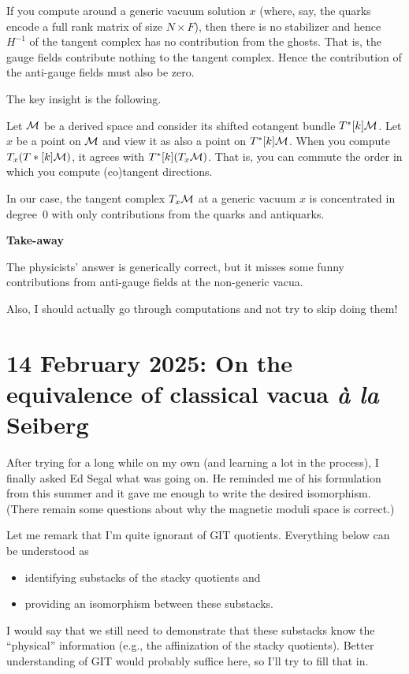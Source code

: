 \documentclass[11pt]{amsart}
\begin{document}
If you compute around a generic vacuum solution $x$ (where, say, the quarks encode a full rank matrix  of size $N \times F$), then there is no stabilizer and hence $H^{-1}$ of the tangent complex has no contribution from the ghosts. That is, the gauge fields contribute nothing to the tangent complex. Hence the contribution of the anti-gauge fields must also be zero.

The key insight is the following. 

Let $\mathcal M$ be a derived space and consider its shifted cotangent bundle $T^*[k]\mathcal M$. Let $x$ be a point on $\mathcal M$ and view it as also a point on $T^*[k]\mathcal M$. When you compute $T_x(T*[k]\mathcal M)$, it agrees with $T^*[k](T_x \mathcal M)$.  That is, you can commute the order in which you compute (co)tangent directions.

In our case, the tangent complex $T_x \mathcal M$ at a generic vacuum $x$ is concentrated in degree~0 with only contributions from the quarks and antiquarks.

{\bf Take-away}

The physicists' answer is generically correct, but it misses some funny contributions from anti-gauge fields at the non-generic vacua. 

Also, I should actually go through computations and not try to skip doing them!

\section{14 February 2025: On the equivalence of classical vacua {\it \`a la} Seiberg}

After trying for a long while on my own (and learning a lot in the process),
I finally asked Ed Segal what was going on.
He reminded me of his formulation from this summer and it gave me enough to write the desired isomorphism.
(There remain some questions about why the magnetic moduli space is correct.)

Let me remark that I'm quite ignorant of GIT quotients.
Everything below can be understood as 
\begin{itemize}
\item identifying substacks of the stacky quotients and
\item providing an isomorphism between these substacks.
\end{itemize}
I would say that we still need to demonstrate that these substacks know the ``physical'' information (e.g., the affinization of the stacky quotients).
Better understanding of GIT would probably suffice here, so I'll try to fill that in.
\end{document}
